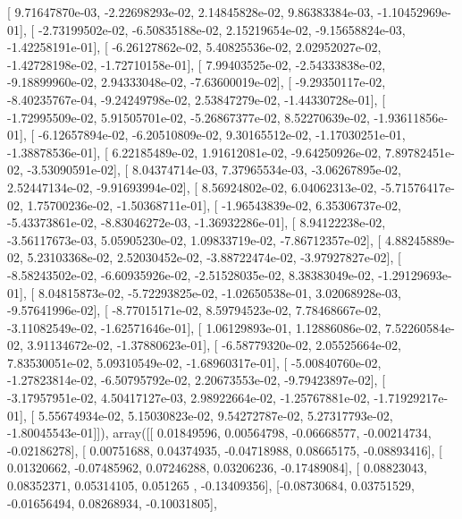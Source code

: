 \documentclass{article}
\begin{document}
       [  9.71647870e-03,  -2.22698293e-02,   2.14845828e-02,
          9.86383384e-03,  -1.10452969e-01],
       [ -2.73199502e-02,  -6.50835188e-02,   2.15219654e-02,
         -9.15658824e-03,  -1.42258191e-01],
       [ -6.26127862e-02,   5.40825536e-02,   2.02952027e-02,
         -1.42728198e-02,  -1.72710158e-01],
       [  7.99403525e-02,  -2.54333838e-02,  -9.18899960e-02,
          2.94333048e-02,  -7.63600019e-02],
       [ -9.29350117e-02,  -8.40235767e-04,  -9.24249798e-02,
          2.53847279e-02,  -1.44330728e-01],
       [ -1.72995509e-02,   5.91505701e-02,  -5.26867377e-02,
          8.52270639e-02,  -1.93611856e-01],
       [ -6.12657894e-02,  -6.20510809e-02,   9.30165512e-02,
         -1.17030251e-01,  -1.38878536e-01],
       [  6.22185489e-02,   1.91612081e-02,  -9.64250926e-02,
          7.89782451e-02,  -3.53090591e-02],
       [  8.04374714e-03,   7.37965534e-03,  -3.06267895e-02,
          2.52447134e-02,  -9.91693994e-02],
       [  8.56924802e-02,   6.04062313e-02,  -5.71576417e-02,
          1.75700236e-02,  -1.50368711e-01],
       [ -1.96543839e-02,   6.35306737e-02,  -5.43373861e-02,
         -8.83046272e-03,  -1.36932286e-01],
       [  8.94122238e-02,  -3.56117673e-03,   5.05905230e-02,
          1.09833719e-02,  -7.86712357e-02],
       [  4.88245889e-02,   5.23103368e-02,   2.52030452e-02,
         -3.88722474e-02,  -3.97927827e-02],
       [ -8.58243502e-02,  -6.60935926e-02,  -2.51528035e-02,
          8.38383049e-02,  -1.29129693e-01],
       [  8.04815873e-02,  -5.72293825e-02,  -1.02650538e-01,
          3.02068928e-03,  -9.57641996e-02],
       [ -8.77015171e-02,   8.59794523e-02,   7.78468667e-02,
         -3.11082549e-02,  -1.62571646e-01],
       [  1.06129893e-01,   1.12886086e-02,   7.52260584e-02,
          3.91134672e-02,  -1.37880623e-01],
       [ -6.58779320e-02,   2.05525664e-02,   7.83530051e-02,
          5.09310549e-02,  -1.68960317e-01],
       [ -5.00840760e-02,  -1.27823814e-02,  -6.50795792e-02,
          2.20673553e-02,  -9.79423897e-02],
       [ -3.17957951e-02,   4.50417127e-03,   2.98922664e-02,
         -1.25767881e-02,  -1.71929217e-01],
       [  5.55674934e-02,   5.15030823e-02,   9.54272787e-02,
          5.27317793e-02,  -1.80045543e-01]]), array([[ 0.01849596,  0.00564798, -0.06668577, -0.00214734, -0.02186278],
       [ 0.00751688,  0.04374935, -0.04718988,  0.08665175, -0.08893416],
       [ 0.01320662, -0.07485962,  0.07246288,  0.03206236, -0.17489084],
       [ 0.08823043,  0.08352371,  0.05314105,  0.051265  , -0.13409356],
       [-0.08730684,  0.03751529, -0.01656494,  0.08268934, -0.10031805],
\end{document}
